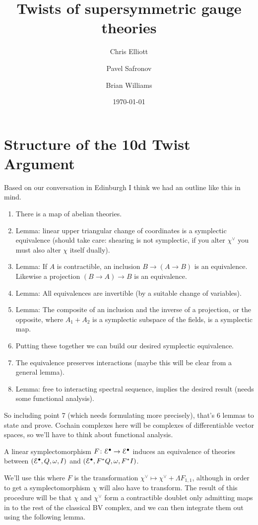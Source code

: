 \documentclass[10pt, oneside]{article}
\title{Twists of supersymmetric gauge theories}
\author{Chris Elliott\and Pavel Safronov \and Brian Williams}
\date{\today}
\begin{document}
\section{Structure of the 10d Twist Argument}

Based on our conversation in Edinburgh I think we had an outline like this in mind.

\begin{enumerate}
\item There is a map of abelian theories.
\item Lemma: linear upper triangular change of coordinates is a symplectic equivalence (should take care: shearing is not symplectic, if you alter $\chi^\vee$ you must also alter $\chi$ itself dually).
\item Lemma: If $A$ is contractible, an inclusion $B \to (A \to B)$ is an equivalence.  Likewise a projection $(B \to A) \to B$ is an equivalence.
\item Lemma: All equivalences are invertible (by a suitable change of variables).
\item Lemma: The composite of an inclusion and the inverse of a projection, or the opposite, where $A_1 + A_2$ is a symplectic subspace of the fields, is a symplectic map.
\item Putting these together we can build our desired symplectic equivalence.
\item The equivalence preserves interactions (maybe this will be clear from a general lemma).
\item Lemma: free to interacting spectral sequence, implies the desired result (needs some functional analysis).
\end{enumerate}

So including point 7 (which needs formulating more precisely), that's 6 lemmas to state and prove.  Cochain complexes here will be complexes of differentiable vector spaces, so we'll have to think about functional analysis.

\begin{lemma} \label{symplectomorphism_lemma}
A linear symplectomorphism $F \colon \mathcal{E}^\bullet \to \mathcal{E}^\bullet$ induces an equivalence of theories between $(\mathcal{E}^\bullet, Q, \omega, I)$ and $(\mathcal{E}^\bullet, F^*Q, \omega, F^*I)$.
\end{lemma}

We'll use this where $F$ is the transformation $\chi^\vee \mapsto \chi^\vee + \Lambda F_{1,1}$, although in order to get a symplectomorphism $\chi$ will also have to transform.  The result of this procedure will be that $\chi$ and $\chi^\vee$ form a contractible doublet only admitting maps in to the rest of the classical BV complex, and we can then integrate them out using the following lemma.
\end{document}
